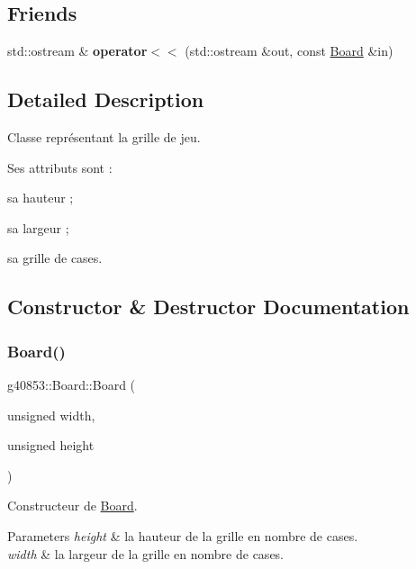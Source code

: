 \subsection*{Friends}
\begin{DoxyCompactItemize}
\item 
\hypertarget{classg40853_1_1_board_a43ea56eff2b5462c9ce89356c1a2a7c3}{}\label{classg40853_1_1_board_a43ea56eff2b5462c9ce89356c1a2a7c3} 
std\+::ostream \& {\bfseries operator$<$$<$} (std\+::ostream \&out, const \hyperlink{classg40853_1_1_board}{Board} \&in)
\end{DoxyCompactItemize}


\subsection{Detailed Description}
Classe représentant la grille de jeu. 

Ses attributs sont \+:


\begin{DoxyItemize}
\item sa hauteur ;
\item sa largeur ;
\item sa grille de cases. 
\end{DoxyItemize}

\subsection{Constructor \& Destructor Documentation}
\hypertarget{classg40853_1_1_board_a977453d70c09bc5c943507febdef3576}{}\label{classg40853_1_1_board_a977453d70c09bc5c943507febdef3576} 
\subsubsection{\texorpdfstring{Board()}{Board()}}
{\footnotesize\ttfamily g40853\+::\+Board\+::\+Board (\begin{DoxyParamCaption}\item[{unsigned}]{width,  }\item[{unsigned}]{height }\end{DoxyParamCaption})}



Constructeur de \hyperlink{classg40853_1_1_board}{Board}. 


\begin{DoxyParams}{Parameters}
{\em height} & la hauteur de la grille en nombre de cases. \\
\hline
{\em width} & la largeur de la grille en nombre de cases. \\
\hline
\end{DoxyParams}


